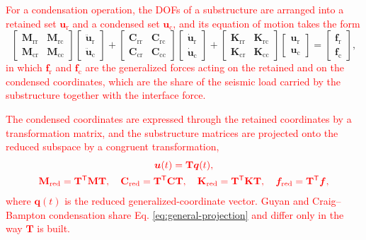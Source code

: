 \documentclass[11pt,a4paper]{article}
\numberwithin{equation}{section}
\newcommand{\rev}[1]{\textcolor{red}{#1}}
\begin{document}
\rev{For a condensation operation, the DOFs of a substructure are arranged into a retained set \(\bm{u}_{\mathrm{r}}\) and a condensed set \(\bm{u}_{\mathrm{c}}\), and its equation of motion takes the form}
\begin{equation}
	\begin{bmatrix}
		\mathbf{M}_{\mathrm{rr}} & \mathbf{M}_{\mathrm{rc}}\\
		\mathbf{M}_{\mathrm{cr}} & \mathbf{M}_{\mathrm{cc}}
	\end{bmatrix}
	\begin{bmatrix}
		\ddot{\bm{u}}_{\mathrm{r}}\\
		\ddot{\bm{u}}_{\mathrm{c}}
	\end{bmatrix}
	+
	\begin{bmatrix}
		\mathbf{C}_{\mathrm{rr}} & \mathbf{C}_{\mathrm{rc}}\\
		\mathbf{C}_{\mathrm{cr}} & \mathbf{C}_{\mathrm{cc}}
	\end{bmatrix}
	\begin{bmatrix}
		\dot{\bm{u}}_{\mathrm{r}}\\
		\dot{\bm{u}}_{\mathrm{c}}
	\end{bmatrix}
	+
	\begin{bmatrix}
		\mathbf{K}_{\mathrm{rr}} & \mathbf{K}_{\mathrm{rc}}\\
		\mathbf{K}_{\mathrm{cr}} & \mathbf{K}_{\mathrm{cc}}
	\end{bmatrix}
	\begin{bmatrix}
		\bm{u}_{\mathrm{r}}\\
		\bm{u}_{\mathrm{c}}
	\end{bmatrix}
	=
	\begin{bmatrix}
		\bm{f}_{\mathrm{r}}\\
		\bm{f}_{\mathrm{c}}
	\end{bmatrix},
	\label{eq:partitioned-local-eom}
\end{equation}
\rev{in which \(\bm{f}_{\mathrm{r}}\) and \(\bm{f}_{\mathrm{c}}\) are the generalized forces acting on the retained and on the condensed coordinates, which are the share of the seismic load carried by the substructure together with the interface force.}

\rev{The condensed coordinates are expressed through the retained coordinates by a transformation matrix, and the substructure matrices are projected onto the reduced subspace by a congruent transformation,}
\begin{equation}
	\begin{gathered}
		\rev{\bm{u}(t)=\mathbf{T}\bm{q}(t),}\\
		\rev{\mathbf{M}_{\mathrm{red}}=\mathbf{T}^{\mathsf{T}}\mathbf{M}\mathbf{T},\quad
			\mathbf{C}_{\mathrm{red}}=\mathbf{T}^{\mathsf{T}}\mathbf{C}\mathbf{T},\quad
			\mathbf{K}_{\mathrm{red}}=\mathbf{T}^{\mathsf{T}}\mathbf{K}\mathbf{T},\quad
			\bm{f}_{\mathrm{red}}=\mathbf{T}^{\mathsf{T}}\bm{f},}
	\end{gathered}
	\label{eq:general-projection}
\end{equation}
\rev{where \(\bm{q}(t)\) is the reduced generalized-coordinate vector. Guyan and Craig--Bampton condensation share Eq. \eqref{eq:general-projection} and differ only in the way \(\mathbf{T}\) is built.}
\end{document}
